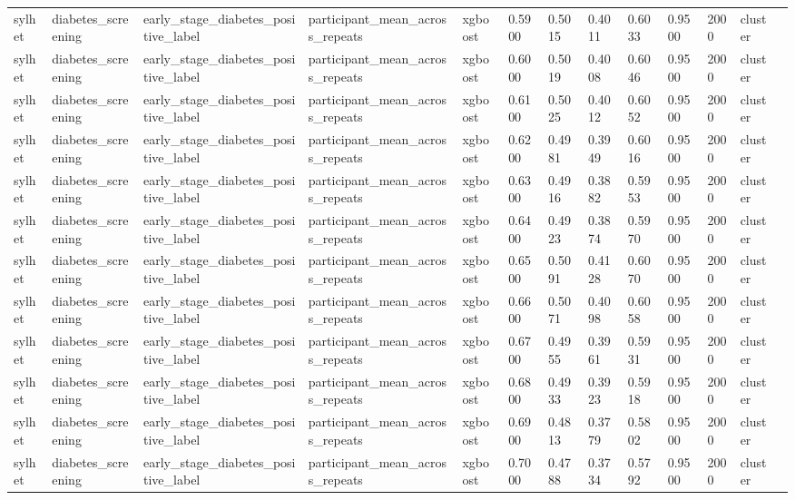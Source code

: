 \begin{tabular}{lllllllllllll}
sylhet & diabetes\_screening & early\_stage\_diabetes\_positive\_label & participant\_mean\_across\_repeats & xgboost & 0.5900 & 0.5015 & 0.4011 & 0.6033 & 0.9500 & 2000 & cluster &  \\
sylhet & diabetes\_screening & early\_stage\_diabetes\_positive\_label & participant\_mean\_across\_repeats & xgboost & 0.6000 & 0.5019 & 0.4008 & 0.6046 & 0.9500 & 2000 & cluster &  \\
sylhet & diabetes\_screening & early\_stage\_diabetes\_positive\_label & participant\_mean\_across\_repeats & xgboost & 0.6100 & 0.5025 & 0.4012 & 0.6052 & 0.9500 & 2000 & cluster &  \\
sylhet & diabetes\_screening & early\_stage\_diabetes\_positive\_label & participant\_mean\_across\_repeats & xgboost & 0.6200 & 0.4981 & 0.3949 & 0.6016 & 0.9500 & 2000 & cluster &  \\
sylhet & diabetes\_screening & early\_stage\_diabetes\_positive\_label & participant\_mean\_across\_repeats & xgboost & 0.6300 & 0.4916 & 0.3882 & 0.5953 & 0.9500 & 2000 & cluster &  \\
sylhet & diabetes\_screening & early\_stage\_diabetes\_positive\_label & participant\_mean\_across\_repeats & xgboost & 0.6400 & 0.4923 & 0.3874 & 0.5970 & 0.9500 & 2000 & cluster &  \\
sylhet & diabetes\_screening & early\_stage\_diabetes\_positive\_label & participant\_mean\_across\_repeats & xgboost & 0.6500 & 0.5091 & 0.4128 & 0.6070 & 0.9500 & 2000 & cluster &  \\
sylhet & diabetes\_screening & early\_stage\_diabetes\_positive\_label & participant\_mean\_across\_repeats & xgboost & 0.6600 & 0.5071 & 0.4098 & 0.6058 & 0.9500 & 2000 & cluster &  \\
sylhet & diabetes\_screening & early\_stage\_diabetes\_positive\_label & participant\_mean\_across\_repeats & xgboost & 0.6700 & 0.4955 & 0.3961 & 0.5931 & 0.9500 & 2000 & cluster &  \\
sylhet & diabetes\_screening & early\_stage\_diabetes\_positive\_label & participant\_mean\_across\_repeats & xgboost & 0.6800 & 0.4933 & 0.3923 & 0.5918 & 0.9500 & 2000 & cluster &  \\
sylhet & diabetes\_screening & early\_stage\_diabetes\_positive\_label & participant\_mean\_across\_repeats & xgboost & 0.6900 & 0.4813 & 0.3779 & 0.5802 & 0.9500 & 2000 & cluster &  \\
sylhet & diabetes\_screening & early\_stage\_diabetes\_positive\_label & participant\_mean\_across\_repeats & xgboost & 0.7000 & 0.4788 & 0.3734 & 0.5792 & 0.9500 & 2000 & cluster &  \\

\end{tabular}
